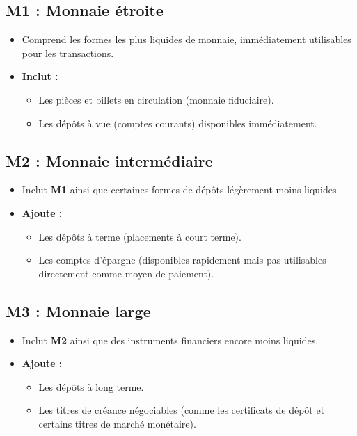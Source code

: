 \documentclass[a4paper, 12pt]{report}
\begin{document}
\subsection*{M1 : Monnaie étroite}
\begin{itemize}
	\item Comprend les formes les plus liquides de monnaie, immédiatement utilisables pour les transactions.
	\item \textbf{Inclut :} 
	\begin{itemize}
		\item Les pièces et billets en circulation (monnaie fiduciaire).
		\item Les dépôts à vue (comptes courants) disponibles immédiatement.
	\end{itemize}
\end{itemize}

\subsection*{M2 : Monnaie intermédiaire}
\begin{itemize}
	\item Inclut \textbf{M1} ainsi que certaines formes de dépôts légèrement moins liquides.
	\item \textbf{Ajoute :}
	\begin{itemize}
		\item Les dépôts à terme (placements à court terme).
		\item Les comptes d'épargne (disponibles rapidement mais pas utilisables directement comme moyen de paiement).
	\end{itemize}
\end{itemize}

\subsection*{M3 : Monnaie large}
\begin{itemize}
	\item Inclut \textbf{M2} ainsi que des instruments financiers encore moins liquides.
	\item \textbf{Ajoute :}
	\begin{itemize}
		\item Les dépôts à long terme.
		\item Les titres de créance négociables (comme les certificats de dépôt et certains titres de marché monétaire).
	\end{itemize}
\end{itemize}
\end{document}
